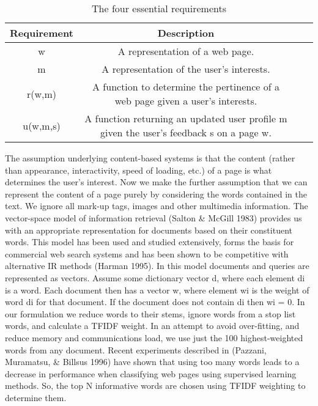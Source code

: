 \begin{table}[ht]
\caption{The four essential requirements} %
\centering  %
\begin{tabular}{c c c c} %
\hline\hline                        %
Requirement & Description\\ [0.5ex] %
\hline                  %
w & A representation of a web page. \\ %
m & A representation of the user's interests.\\
r(w,m)& A function to determine the pertinence of a web page given a user's interests.\\
u(w,m,s)& A function returning an updated user profile m given the user's feedback s on a page w. \\[1ex]      %
\hline %
\end{tabular}
\label{table:2} %
\end{table}
The assumption underlying content-based systems is that the content (rather than appearance, interactivity, speed of loading, etc.) of a page is what determines the user's interest. Now we make the further assumption that we can represent the content of a page purely by considering the words contained in the text. We ignore all mark-up tags, images and other multimedia information.
The vector-space model of information retrieval (Salton & McGill 1983) provides us with an appropriate representation for documents based on their constituent words. This model has been used and studied extensively, forms the basis for commercial web search systems and has been shown to be competitive with alternative IR methods (Harman 1995).
In this model documents and queries are represented as vectors. Assume some dictionary vector d, where each element di is a word. Each document then has a vector w, where element wi is the weight of word di for that document. If the document does not contain di then wi = 0.
In our formulation we reduce words to their stems, ignore words from a stop list words, and calculate a TFIDF weight.
In an attempt to avoid over-fitting, and reduce memory and communications load, we use just the 100 highest-weighted words from any document. Recent experiments described in (Pazzani, Muramatsu, & Billsus 1996) have shown that using too many words leads to a decrease in performance when classifying web pages using supervised learning methods. So, the top N informative words are chosen using TFIDF weighting to determine them.
